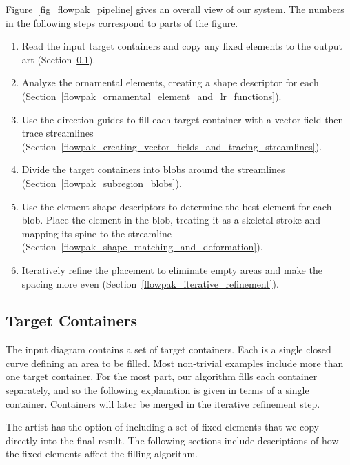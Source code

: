 Figure~\ref{fig_flowpak_pipeline} gives an overall view of our system. The numbers in the following
steps correspond to parts of the figure.


\begin{enumerate}
  \item Read the input target containers and
  copy any fixed elements to the output art (Section~\ref{flowpak_target_containers}).
  \item Analyze the ornamental elements, creating a shape descriptor for each
   (Section~\ref{flowpak_ornamental_element_and_lr_functions}).
  \item Use the direction guides to fill each target container with a vector field then trace streamlines 
  (Section~\ref{flowpak_creating_vector_fields_and_tracing_streamlines}).
  \item Divide the target containers into blobs around the streamlines (Section~\ref{flowpak_subregion_blobs}).
  \item Use the element shape descriptors to determine the best element for each blob. 
        Place the element in the blob, treating it as a skeletal stroke and mapping its
        spine to the streamline (Section~\ref{flowpak_shape_matching_and_deformation}).
  \item Iteratively refine the placement to eliminate empty areas and make the spacing more even (Section~\ref{flowpak_iterative_refinement}).
\end{enumerate}

\subsection{Target Containers}
\label{flowpak_target_containers}

The input diagram contains a set of target containers. Each is a single
closed curve defining an area
to be filled.  Most non-trivial examples include more than one target
container.  For the most part, our algorithm fills each container separately,
and so the following explanation is given in terms of a single container.
Containers will later be merged in the iterative refinement step.

The artist has the option of including a set of fixed elements that
we copy directly into the final result. The following sections
include descriptions of how the fixed elements affect the filling
algorithm.

